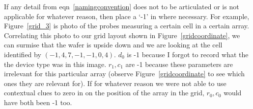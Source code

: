 \documentclass{article}
\begin{document}
          If any detail from eqn~\ref{namingconvention} does not to be articulated or is not applicable for whatever
          reason, then place a `-1' in where necessary. For example, Figure~\ref{grid_3} is photo of the probes
          measuring a certain cell in a certain array. Correlating this photo to our grid layout shown in
          Figure~\ref{gridcoordinate}, we can surmise that the wafer is upside down and we are looking at the cell
          identified by $(-1, 4, 7, -1, -1, 0, 4)$. $d_0$ is -1 because I forgot to record what the the device type was
          in this image. $r_1, c_1$ are -1 because these parameters are irrelevant for this particular array (observe
          Figure~\ref{gridcoordinate} to see which ones they are relevant for). If for whatever reason we were not able
          to use contextual clues to zero in on the position of the array in the grid, $r_0, c_0$ would have both been
          -1 too.
\end{document}
